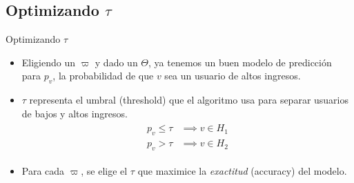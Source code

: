 \documentclass[usenames,dvipsnames,table]{beamer}
\begin{document}
\subsection{Optimizando $\tau$}

\begin{frame}{Optimizando $\tau$}
	\begin{itemize}
		\item Eligiendo un $\varpi$ y dado un $\Theta$, ya tenemos un buen modelo de predicción para $p_v$, la probabilidad de que $v$ sea un usuario de altos ingresos.
		\item $\tau$ representa el umbral (threshold) que el algoritmo usa para separar usuarios de bajos y altos ingresos.
			\begin{gather*}
				\begin{aligned}
					p_v \leq \tau &\implies v \in H_1 \\
					p_v >    \tau &\implies v \in H_2
				\end{aligned}
			\end{gather*}
		\item Para cada $\varpi$, se elige el $\tau$ que maximice la \emph{exactitud} (accuracy) del modelo.
	\end{itemize}
\end{frame}
\end{document}
